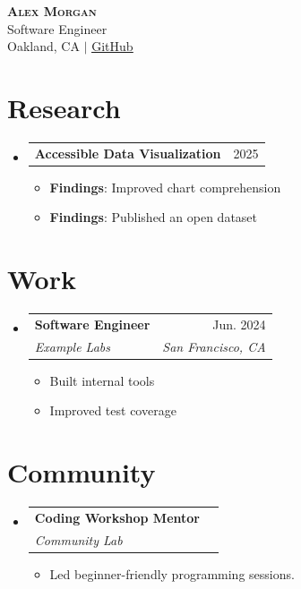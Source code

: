 \documentclass[letterpaper,11pt]{article}
\makeatletter
\newcommand{\resumeLink}[2]{\underline{\href{#1}{#2}}}
\newcommand{\resumeSection}[1]{\section{#1}}
\newcommand{\resumeSubHeadingListStart}{\begin{itemize}[leftmargin=0.15in, label={}]}
\newcommand{\resumeSubHeadingListEnd}{\end{itemize}}
\newcommand{\resumeItemListStart}{\begin{itemize}}
\newcommand{\resumeItemListEnd}{\end{itemize}\vspace{-5pt}}
\newcommand{\resumeItem}[1]{\item\small{{#1 \vspace{-2pt}}}}
\newcommand{\resumeSubheading}[4]{\vspace{-2pt}\item\begin{tabular*}{0.97\textwidth}[t]{l@{\extracolsep{\fill}}r}\textbf{#1} & #2 \\\textit{\small#3} & \textit{\small #4} \\\end{tabular*}\vspace{-7pt}}
\newcommand{\resumeProjectHeading}[2]{\item\begin{tabular*}{0.97\textwidth}{l@{\extracolsep{\fill}}r}\small#1 & #2 \\\end{tabular*}\vspace{-7pt}}
\newcommand{\resumeSingleLine}[2]{\resumeProjectHeading{\textbf{#1}}{#2}}
\makeatother
\begin{document}
\begin{center}
    \textbf{\Huge \scshape Alex Morgan} \\ \vspace{5pt}
    \small Software Engineer \\
    \small Oakland, CA $|$ \resumeLink{https://github.com/example}{GitHub} \\
\end{center}
\resumeSection{Research}
\resumeSubHeadingListStart
\resumeSingleLine{Accessible Data Visualization}{2025}
\resumeItemListStart
\resumeItem{\textbf{Findings}: Improved chart comprehension}
\resumeItem{\textbf{Findings}: Published an open dataset}
\resumeItemListEnd
\resumeSubHeadingListEnd
\resumeSection{Work}
\resumeSubHeadingListStart
\resumeSubheading{Software Engineer}{Jun. 2024}{Example Labs}{San Francisco, CA}
\resumeItemListStart
\resumeItem{Built internal tools}
\resumeItem{Improved test coverage}
\resumeItemListEnd
\resumeSubHeadingListEnd
\resumeSection{Community}
\resumeSubHeadingListStart
\resumeSubheading{Coding Workshop Mentor}{}{Community Lab}{}
\resumeItemListStart
\resumeItem{Led beginner-friendly programming sessions.}
\resumeItemListEnd
\resumeSubHeadingListEnd
\end{document}
